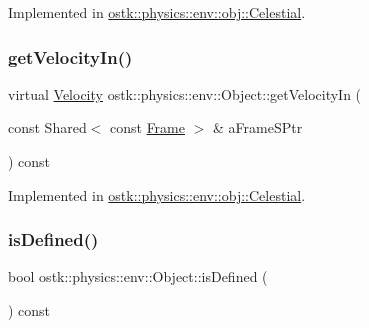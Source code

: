 Implemented in \hyperlink{classostk_1_1physics_1_1env_1_1obj_1_1_celestial_a8fa63af32cf8785ff6d3762d6f8dcd86}{ostk\+::physics\+::env\+::obj\+::\+Celestial}.

\mbox{\label{classostk_1_1physics_1_1env_1_1_object_a216c8d5e44451fd664e0c7eb3b4934b6}} 
\subsubsection{\texorpdfstring{get\+Velocity\+In()}{getVelocityIn()}}
{\footnotesize\ttfamily virtual \hyperlink{classostk_1_1physics_1_1coord_1_1_velocity}{Velocity} ostk\+::physics\+::env\+::\+Object\+::get\+Velocity\+In (\begin{DoxyParamCaption}\item[{const Shared$<$ const \hyperlink{classostk_1_1physics_1_1coord_1_1_frame}{Frame} $>$ \&}]{a\+Frame\+S\+Ptr }\end{DoxyParamCaption}) const\hspace{0.3cm}{\ttfamily [pure virtual]}}



Implemented in \hyperlink{classostk_1_1physics_1_1env_1_1obj_1_1_celestial_a748a113566d79c463e84bf62f05af83a}{ostk\+::physics\+::env\+::obj\+::\+Celestial}.

\mbox{\label{classostk_1_1physics_1_1env_1_1_object_aaa5131bafbaf86fde7f649e88343a901}} 
\subsubsection{\texorpdfstring{is\+Defined()}{isDefined()}}
{\footnotesize\ttfamily bool ostk\+::physics\+::env\+::\+Object\+::is\+Defined (\begin{DoxyParamCaption}{ }\end{DoxyParamCaption}) const\hspace{0.3cm}{\ttfamily [virtual]}}



